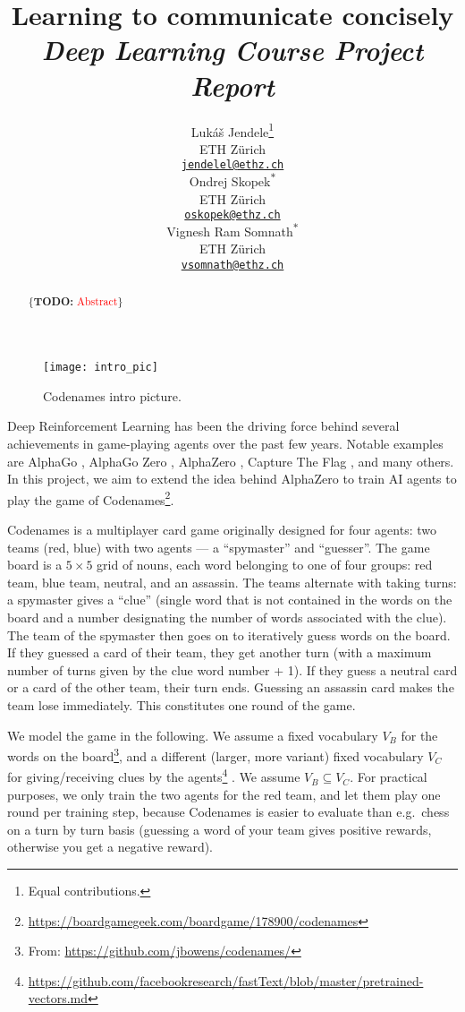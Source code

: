 \documentclass{article}
\title{Learning to communicate concisely\\{\large \textit{Deep Learning Course Project Report}}}
\author{
  Luk\'{a}\v{s} Jendele\thanks{Equal contributions.}\\
  ETH Z\"{u}rich\\
  \href{mailto:jendelel@ethz.ch}{\texttt{jendelel@ethz.ch}}\\
  \And
  Ondrej Skopek\textsuperscript{$\ast$}\\
  ETH Z\"{u}rich\\
  \href{mailto:oskopek@ethz.ch}{\texttt{oskopek@ethz.ch}}\\
  \And
  Vignesh Ram Somnath\textsuperscript{$\ast$}\\
  ETH Z\"{u}rich\\
  \href{mailto:vsomnath@ethz.ch}{\texttt{vsomnath@ethz.ch}}
}
\newcommand{\TODO}[1]{\{\textbf{TODO: }\textcolor{red}{#1}\}}
\begin{document}
\maketitle

\begin{figure}[!h]
    \centering
    \texttt{[image: intro\_pic]}
    \caption{Codenames intro picture.}\label{fig:intro}
\end{figure}

\begin{abstract}
\TODO{Abstract}
\end{abstract}

Deep Reinforcement Learning has been the driving force behind several achievements in game-playing agents over the past few years. Notable examples are AlphaGo \cite{alphago}, AlphaGo Zero \cite{alphagozero}, AlphaZero \cite{alphazero}, Capture The Flag \cite{ctf}, and many others. In this project, we aim to extend the idea behind AlphaZero to train AI agents to play the game of Codenames\footnote{\url{https://boardgamegeek.com/boardgame/178900/codenames}}.

Codenames is a multiplayer card game originally designed for four agents: two teams (red, blue) with two agents --- a ``spymaster'' and ``guesser''. The game board is a $5 \times 5$ grid of nouns, each word belonging to one of four groups: red team, blue team, neutral, and an assassin. The teams alternate with taking turns: a spymaster gives a ``clue'' (single word that is not contained in the words on the board and a number designating the number of words associated with the clue). The team of the spymaster then goes on to iteratively guess words on the board. If they guessed a card of their team, they get another turn (with a maximum number of turns given by the clue word number + 1). If they guess a neutral card or a card of the other team, their turn ends. Guessing an assassin card makes the team lose immediately. This constitutes one round of the game.

We model the game in the following. We assume a fixed vocabulary $V_B$ for the words on the board\footnote{From: \url{https://github.com/jbowens/codenames/}}, and a different (larger, more variant) fixed vocabulary $V_C$ for giving/receiving clues by the agents\footnote{\url{https://github.com/facebookresearch/fastText/blob/master/pretrained-vectors.md}} \cite{fasttext}. We assume $V_B \subseteq V_C$. For practical purposes, we only train the two agents for the red team, and let them play one round per training step, because Codenames is easier to evaluate than e.g.~chess on a turn by turn basis (guessing a word of your team gives positive rewards, otherwise you get a negative reward).
\end{document}
